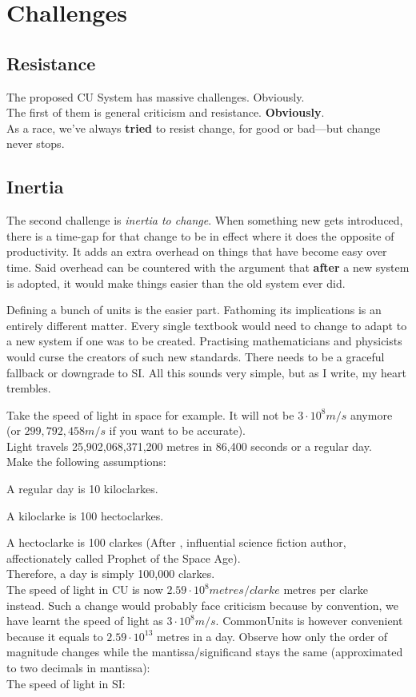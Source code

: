 \chapter{Challenges}
\section{Resistance}

The proposed CU System has massive challenges. Obviously.\\
The first of them is general criticism and resistance. \textbf{Obviously}.\\
As a race, we've always \textbf{tried} to resist change, for good or bad—but change never stops.

\section{Inertia}
The second challenge is \textit{inertia to change}. When something new gets introduced, there is a time-gap for that change to be in effect where it does the opposite of productivity.
It adds an extra overhead on things that have become easy over time. Said overhead can be countered with the argument that \textbf{after} a new system is adopted, it would make things easier than the old system ever did.

Defining a bunch of units is the easier part. Fathoming its implications is an entirely different matter.
Every single textbook would need to change to adapt to a new system if one was to be created.
Practising mathematicians and physicists would curse the creators of such new standards.
There needs to be a graceful fallback or downgrade to SI\@.
All this sounds very simple, but as I write, my heart trembles.

Take the speed of light in space for example. It will not be \(3\cdot10^8m/s\) anymore (or \(299,792,458m/s\) if you want to be accurate).\\
Light travels 25,902,068,371,200 metres in 86,400 seconds or a regular day.\\
Make the following assumptions:

A regular day is 10 kiloclarkes.

A kiloclarke is 100 hectoclarkes.

A hectoclarke is 100 clarkes (After , influential science fiction author, affectionately called Prophet of the Space Age).\\
Therefore, a day is simply 100,000 clarkes.\\
The speed of light in CU is now \(2.59\cdot10^8 metres/clarke\) metres per clarke instead.
Such a change would probably face criticism because by convention, we have learnt the speed of light as \(3\cdot10^8m/s\).
CommonUnits is however convenient because it equals to \(2.59\cdot10^{13}\) metres in a day. Observe how only the order of magnitude changes while the mantissa/significand stays the same (approximated to two decimals in mantissa):
\\
The speed of light in SI\@:

